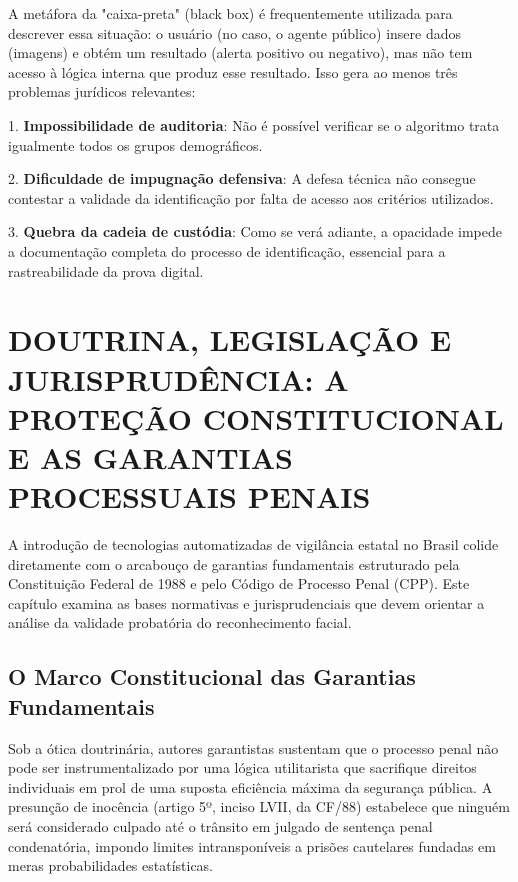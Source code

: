 \documentclass[12pt,a4paper]{article}
\begin{document}
A metáfora da "caixa-preta" (black box) é frequentemente utilizada para descrever essa situação: o usuário (no caso, o agente público) insere dados (imagens) e obtém um resultado (alerta positivo ou negativo), mas não tem acesso à lógica interna que produz esse resultado. Isso gera ao menos três problemas jurídicos relevantes:

1. \textbf{Impossibilidade de auditoria}: Não é possível verificar se o algoritmo trata igualmente todos os grupos demográficos.

2. \textbf{Dificuldade de impugnação defensiva}: A defesa técnica não consegue contestar a validade da identificação por falta de acesso aos critérios utilizados.

3. \textbf{Quebra da cadeia de custódia}: Como se verá adiante, a opacidade impede a documentação completa do processo de identificação, essencial para a rastreabilidade da prova digital.

\section{DOUTRINA, LEGISLAÇÃO E JURISPRUDÊNCIA: A PROTEÇÃO CONSTITUCIONAL E AS GARANTIAS PROCESSUAIS PENAIS}

A introdução de tecnologias automatizadas de vigilância estatal no Brasil colide diretamente com o arcabouço de garantias fundamentais estruturado pela Constituição Federal de 1988 e pelo Código de Processo Penal (CPP). Este capítulo examina as bases normativas e jurisprudenciais que devem orientar a análise da validade probatória do reconhecimento facial.

\subsection{O Marco Constitucional das Garantias Fundamentais}

Sob a ótica doutrinária, autores garantistas sustentam que o processo penal não pode ser instrumentalizado por uma lógica utilitarista que sacrifique direitos individuais em prol de uma suposta eficiência máxima da segurança pública. A presunção de inocência (artigo 5º, inciso LVII, da CF/88) estabelece que ninguém será considerado culpado até o trânsito em julgado de sentença penal condenatória, impondo limites intransponíveis a prisões cautelares fundadas em meras probabilidades estatísticas.
\end{document}
